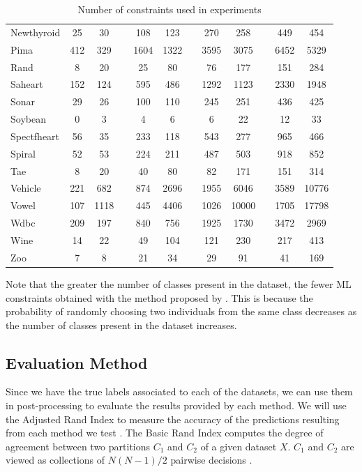 \documentclass[review]{elsarticle}
\begin{document}
\begin{table}[!h]
{\begin{tabular}{lcc c cc c cc c cc}
		Newthyroid & 25 & 30 && 108 & 123 && 270 & 258 && 449 & 454 \\
		Pima & 412 & 329 && 1604 & 1322 && 3595 & 3075 && 6452 & 5329 \\
		Rand & 8 & 20 && 25 & 80 && 76 & 177 && 151 & 284 \\
		Saheart & 152 & 124 && 595 & 486 && 1292 & 1123 && 2330 & 1948 \\
		Sonar & 29 & 26 && 100 & 110 && 245 & 251 && 436 & 425 \\
		Soybean & 0 & 3 && 4 & 6 && 6 & 22 && 12 & 33 \\
		Spectfheart & 56 & 35 && 233 & 118 && 543 & 277 && 965 & 466 \\
		Spiral & 52 & 53 && 224 & 211 && 487 & 503 && 918 & 852 \\
		Tae & 8 & 20 && 40 & 80 && 82 & 171 && 151 & 314 \\
		Vehicle & 221 & 682 && 874 & 2696 && 1955 & 6046 && 3589 & 10776 \\
		Vowel & 107 & 1118 && 445 & 4406 && 1026 & 10000 && 1705 & 17798 \\
		Wdbc & 209 & 197 && 840 & 756 && 1925 & 1730 && 3472 & 2969 \\
		Wine & 14 & 22 && 49 & 104 && 121 & 230 && 217 & 413 \\
		Zoo & 7 & 8 && 21 & 34 && 29 & 91 && 41 & 169 \\
		\hline

	\end{tabular}}

	\caption{Number of constraints used in experiments}
	\label{tab:constraints}
\end{table}

Note that the greater the number of classes present in the dataset, the fewer ML constraints obtained with the method proposed by \cite{wagstaff2001constrained}. This is because the probability of randomly choosing two individuals from the same class decreases as the number of classes present in the dataset increases.

\clearpage

\subsection{Evaluation Method}

Since we have the true labels associated to each of the datasets, we can use them in post-processing to evaluate the results provided by each method. We will use the Adjusted Rand Index to measure the accuracy of the predictions resulting from each method we test \cite{hubert1985comparing}. The Basic Rand Index computes the degree of agreement between two partitions $C_1$ and $C_2$ of a given dataset $X$. $C_1$ and $C_2$ are viewed as collections of $N(N - 1)/2$ pairwise decisions \cite{rand1971objective}.
\end{document}
